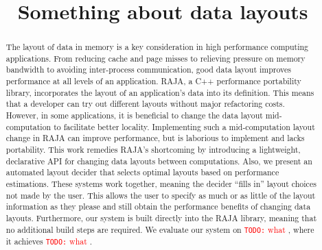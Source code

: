 \documentclass[sigconf, table]{acmart}
\title{Something about data layouts}
\newcommand{\todo}[1]{{\textcolor{red}{{\tt{TODO:}}\,\,#1 }}}
\begin{document}
\begin{abstract}



The layout of data in memory is a key consideration in high performance computing applications.
From reducing cache and page misses to relieving pressure on memory bandwidth to avoiding inter-process communication, good data layout improves performance at all levels of an application.
RAJA, a C++ performance portability library, incorporates the layout of an application's data into its definition.
This means that a developer can try out different layouts without major refactoring costs.
However, in some applications, it is beneficial to change the data layout mid-computation to facilitate better locality.
Implementing such a mid-computation layout change in RAJA can improve performance, but is laborious to implement and lacks portability.
This work remedies RAJA's shortcoming by introducing a lightweight, declarative API for changing data layouts between computations.
Also, we present an automated layout decider that selects optimal layouts based on performance estimations. 
These systems work together, meaning the decider \enquote{fills in} layout choices not made by the user.
This allows the user to specify as much or as little of the layout information as they please and still obtain the performance benefits of changing data layouts.  
Furthermore, our system is built directly into the RAJA library, meaning that no additional build steps are required.
We evaluate our system on \todo{what}, where it achieves \todo{what}.
\end{abstract}
\end{document}
